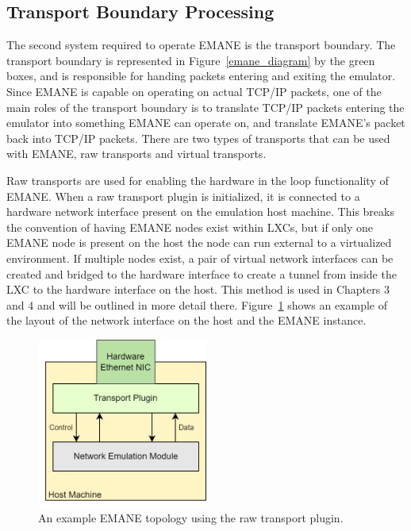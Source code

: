 \subsection{Transport Boundary Processing}
The second system required to operate EMANE is the transport boundary.
The transport boundary is represented in Figure~\ref{emane_diagram} by the green boxes, and is responsible for handing packets entering and exiting the emulator.
Since EMANE is capable on operating on actual TCP/IP packets, one of the main roles of the transport boundary is to translate TCP/IP packets entering the emulator into something EMANE can operate on, and translate EMANE's packet back into TCP/IP packets.
There are two types of transports that can be used with EMANE, raw transports and virtual transports. \par
Raw transports are used for enabling the hardware in the loop functionality of EMANE.
When a raw transport plugin is initialized, it is connected to a hardware network interface present on the emulation host machine.
This breaks the convention of having EMANE nodes exist within LXCs, but if only one EMANE node is present on the host the node can run external to a virtualized environment.
If multiple nodes exist, a pair of virtual network interfaces can be created and bridged to the hardware interface to create a tunnel from inside the LXC to the hardware interface on the host.
This method is used in Chapters 3 and 4 and will be outlined in more detail there.
Figure~\ref{emane_raw_transport} shows an example of the layout of the network interface on the host and the EMANE instance.

\begin{figure}[!ht]
    \centering
    \includegraphics[width=0.5\textwidth,keepaspectratio]{Images/Chpt2/RawTransport.png}
    \caption{An example EMANE topology using the raw transport plugin.}
    \label{emane_raw_transport}
\end{figure}

